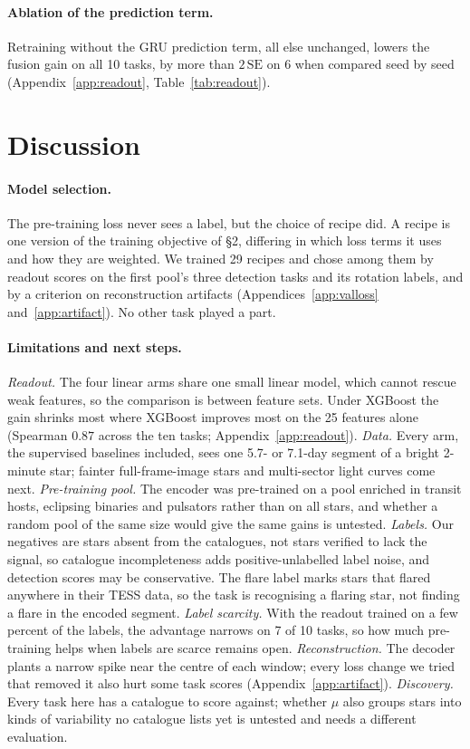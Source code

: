 \documentclass{article}
\begin{document}
\paragraph{Ablation of the prediction term.} Retraining without the GRU prediction term,
all else unchanged, lowers the fusion gain on all 10 tasks, by more than $2\,\mathrm{SE}$ on 6 when
compared seed by seed (Appendix~\ref{app:readout}, Table~\ref{tab:readout}).

\section{Discussion}

\paragraph{Model selection.} The pre-training loss never sees a label, but the choice of recipe did.
A recipe is one version of the training objective of \S2, differing in which loss terms it uses and
how they are weighted. We trained 29 recipes and chose among them by readout scores on the first
pool's three detection tasks and its rotation labels, and by a criterion on reconstruction artifacts
(Appendices~\ref{app:valloss} and~\ref{app:artifact}). No other task played a part.

\paragraph{\textbf{Limitations and next steps.}} \emph{Readout.} The four linear arms share one small linear model, which
cannot rescue weak features, so the comparison is between feature sets. Under XGBoost the gain
shrinks most where XGBoost improves most on the 25 features alone (Spearman $0.87$ across the ten tasks;
Appendix~\ref{app:readout}). \emph{Data.} Every arm, the supervised baselines
included, sees one 5.7- or 7.1-day segment of a bright 2-minute star; fainter full-frame-image stars and
multi-sector light curves come next. \emph{Pre-training pool.} The encoder was pre-trained on a pool
enriched in transit hosts, eclipsing binaries and pulsators rather than on all stars, and whether a
random pool of the same size would give the same gains is untested. \emph{Labels.} Our
negatives are stars absent from the catalogues, not stars verified to lack the signal, so
catalogue incompleteness adds positive-unlabelled label noise, and detection scores may be
conservative. The flare label marks stars that flared anywhere in their TESS data, so the task is
recognising a flaring star, not finding a flare in the encoded segment. \emph{Label scarcity.} With
the readout trained on a few percent of the labels, the advantage narrows on 7 of 10 tasks, so how
much pre-training helps when labels are scarce remains open. \emph{Reconstruction.} The decoder
plants a narrow spike near the centre of each window; every loss change we tried that removed it
also hurt some task scores (Appendix~\ref{app:artifact}). \emph{Discovery.} Every task here has a
catalogue to score against; whether $\mu$ also groups stars into kinds of variability no
catalogue lists yet is untested and needs a different evaluation.
\end{document}
